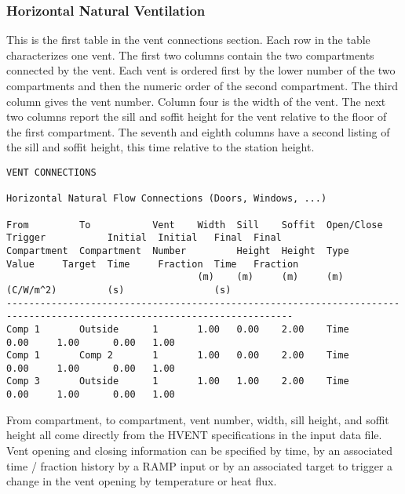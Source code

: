 \subsubsection{Horizontal Natural Ventilation}
This is the first table in the vent connections section.  Each row in the table characterizes one vent.  The first two columns contain the two compartments connected by the vent.  Each vent is ordered first by the lower number of the two compartments and then the numeric order of the second compartment.  The third column gives the vent number.  Column four is the width of the vent.  The next two columns report the sill and soffit height for the vent relative to the floor of the first compartment.  The seventh and eighth columns have a second listing of the sill and soffit height, this time relative to the station height.
\begin{lstlisting}[basicstyle=\tiny]
VENT CONNECTIONS

Horizontal Natural Flow Connections (Doors, Windows, ...)

From         To           Vent    Width  Sill    Soffit  Open/Close  Trigger           Initial  Initial   Final  Final
Compartment  Compartment  Number         Height  Height  Type        Value     Target  Time     Fraction  Time   Fraction
                                  (m)    (m)     (m)     (m)         (C/W/m^2)         (s)                (s)
-------------------------------------------------------------------------------------------------------------------------
Comp 1       Outside      1       1.00   0.00    2.00    Time                          0.00     1.00      0.00   1.00
Comp 1       Comp 2       1       1.00   0.00    2.00    Time                          0.00     1.00      0.00   1.00
Comp 3       Outside      1       1.00   1.00    2.00    Time                          0.00     1.00      0.00   1.00
\end{lstlisting}
From compartment, to compartment, vent number, width, sill height, and soffit height all come directly from the HVENT specifications in the input data file. Vent opening and closing information can be specified by time, by an associated time / fraction history by a RAMP input or by an associated target to trigger a change in the vent opening by temperature or heat flux.

